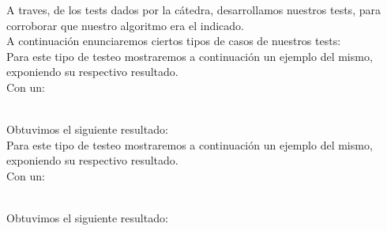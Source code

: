 \indent A traves, de los tests dados por la c\'atedra, desarrollamos nuestros tests,
para corroborar que nuestro algoritmo era el indicado.\\

A continuaci\'on enunciaremos ciertos tipos de casos de nuestros tests:\\

 Para este tipo de testeo mostraremos a continuaci\'on un ejemplo del mismo, exponiendo su respectivo resultado.\\

 Con un:\\\\
  \indent  
  
  Obtuvimos el siguiente resultado:\\

 Para este tipo de testeo mostraremos a continuaci\'on un ejemplo del mismo, exponiendo su respectivo resultado.\\

 Con un:\\\\
  \indent  
  
  Obtuvimos el siguiente resultado:\\
 
